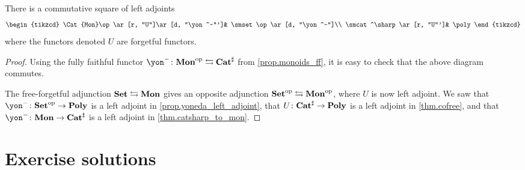 \documentclass[Book-Poly]{subfiles}
\begin{document}
\begin{proposition}\label{prop.traj_mon_poly}
There is a commutative square of left adjoints
\[
\begin{tikzcd}
	\Cat{Mon}\op\ar[r, "U"]\ar[d, "\yon^-"']&
	\smset\op\ar[d, "\yon^-"]\\
	\smcat^\sharp\ar[r, "U"']&
	\poly
\end{tikzcd}
\]
where the functors denoted $U$ are forgetful functors.
\end{proposition}
\begin{proof}
Using the fully faithful functor $\yon^-\colon\Cat{Mon}\op\fromto\smcat^\sharp$ from \cref{prop.monoids_ff}, it is easy to check that the above diagram commutes. 

The free-forgetful adjunction $\mathbf{Set}\leftrightarrows\mathbf{Mon}$ gives an opposite adjunction $\mathbf{Set}^{\textnormal{op}}\leftrightarrows\mathbf{Mon}^{\textnormal{op}}$, where $U$ is now left adjoint. We saw that $\yon^-\colon\smset\op\to\poly$ is a left adjoint in \cref{prop.yoneda_left_adjoint}, that $U\colon\mathbf{Cat}^\sharp\to\mathbf{Poly}$ is a left adjoint in \cref{thm.cofree}, and that $\yon^-\colon\Cat{Mon}\to\smcat^\sharp$ is a left adjoint in \cref{thm.catsharp_to_mon}.
\end{proof}





 \section{Exercise solutions}
 \footnotesize
 
\end{document}
